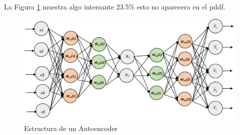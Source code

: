 \lipsum[3] La Figura \ref{fig:autoencoder_Estructura} muestra algo intersante \parencite{alberti2018} 23.5\% esto no aparecera en el pddf.

\begin{figure}[h!]
    \centering
    \includegraphics[width=\textwidth]{imagenes/autoencoder.png}
    \caption{Estructura de un Autoencoder}
    \label{fig:autoencoder_Estructura}
\end{figure}
